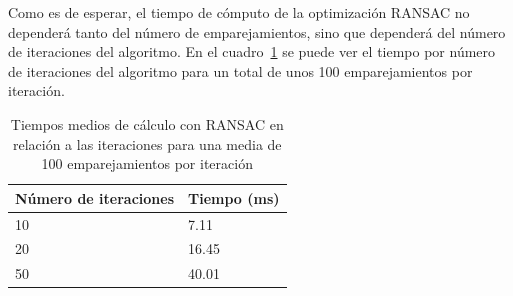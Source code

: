 Como es de esperar, el tiempo de cómputo de la optimización RANSAC no dependerá tanto del número de emparejamientos, sino que dependerá del número de iteraciones del algoritmo. En el cuadro~\ref{tab:ransac-time} se puede ver el tiempo por número de iteraciones del algoritmo para un total de unos 100 emparejamientos por iteración.

\begin{table}
\caption{Tiempos medios de cálculo con RANSAC en relación a las iteraciones para una media de 100 emparejamientos por iteración}
\label{tab:ransac-time}
\centering
\begin{tabular}{ l | l }
\toprule
\textbf{Número de iteraciones} & \textbf{Tiempo (ms)}\\
\hline\hline
10 & 7.11\\
\hline
20 & 16.45\\
\hline
50 & 40.01\\
\bottomrule
\end{tabular}
\end{table}